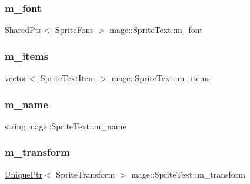 \hypertarget{classmage_1_1_sprite_text_a922e37fbcbc431e815ebabe82e4528b0}{}\label{classmage_1_1_sprite_text_a922e37fbcbc431e815ebabe82e4528b0} 
\subsubsection{\texorpdfstring{m\+\_\+font}{m\_font}}
{\footnotesize\ttfamily \hyperlink{namespacemage_a1e01ae66713838a7a67d30e44c67703e}{Shared\+Ptr}$<$ \hyperlink{classmage_1_1_sprite_font}{Sprite\+Font} $>$ mage\+::\+Sprite\+Text\+::m\+\_\+font\hspace{0.3cm}{\ttfamily [private]}}

\hypertarget{classmage_1_1_sprite_text_a5990cef53a24dcd6d6bf0ff550145ca4}{}\label{classmage_1_1_sprite_text_a5990cef53a24dcd6d6bf0ff550145ca4} 
\subsubsection{\texorpdfstring{m\+\_\+items}{m\_items}}
{\footnotesize\ttfamily vector$<$ \hyperlink{structmage_1_1_sprite_text_item}{Sprite\+Text\+Item} $>$ mage\+::\+Sprite\+Text\+::m\+\_\+items\hspace{0.3cm}{\ttfamily [private]}}

\hypertarget{classmage_1_1_sprite_text_a2c4cde370b6785d970c2d3ef127dda87}{}\label{classmage_1_1_sprite_text_a2c4cde370b6785d970c2d3ef127dda87} 
\subsubsection{\texorpdfstring{m\+\_\+name}{m\_name}}
{\footnotesize\ttfamily string mage\+::\+Sprite\+Text\+::m\+\_\+name\hspace{0.3cm}{\ttfamily [private]}}

\hypertarget{classmage_1_1_sprite_text_a2b8441454a3811e6a1869d999c4d2063}{}\label{classmage_1_1_sprite_text_a2b8441454a3811e6a1869d999c4d2063} 
\subsubsection{\texorpdfstring{m\+\_\+transform}{m\_transform}}
{\footnotesize\ttfamily \hyperlink{namespacemage_a8c307fbcc33bce9b7f2aa4c26c3b95cf}{Unique\+Ptr}$<$ Sprite\+Transform $>$ mage\+::\+Sprite\+Text\+::m\+\_\+transform\hspace{0.3cm}{\ttfamily [private]}}

